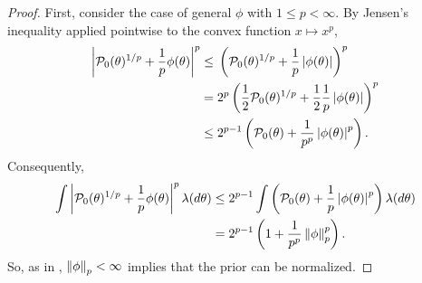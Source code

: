 






\begin{proof}
%
First, consider the case of general $\phi$ with $1 \le p < \infty$. By Jensen's
inequality applied pointwise to the convex function $x \mapsto x^p$,
%
\begin{align*}
%
\abs{\pbase(\theta)^{1/p} + \frac{1}{p}\phi(\theta) }^{p} \le{}&
    \left(\pbase(\theta)^{1/p} + \frac{1}{p}\abs{\phi(\theta)} \right)^{p}
\\={}&
    2^p \left(\frac{1}{2}\pbase(\theta)^{1/p} +
              \frac{1}{2} \frac{1}{p}\abs{\phi(\theta)} \right)^{p}
\\\le{}&
    2^{p-1} \left(\pbase(\theta) + \frac{1}{p^p}\abs{\phi(\theta)}^p \right).
%
\end{align*}
%
Consequently,
%
\begin{align*}
%
\int \abs{\pbase(\theta)^{1/p} + \frac{1}{p}\phi(\theta) }^{p}
    \lambda(d\theta) \le{}&
2^{p-1} \int \left(\pbase(\theta) + \frac{1}{p}\abs{\phi(\theta)}^p \right)
    \lambda(d\theta)
\\={}&
    2^{p-1} \left(1 + \frac{1}{p^p}\norm{\phi}_p^p\right).
%
\end{align*}
%
So, as in \citep[Result 2]{gustafson:1996:local}, $\left\Vert\phi\right\Vert_p < \infty$
implies that the prior can be normalized.


\end{proof}
